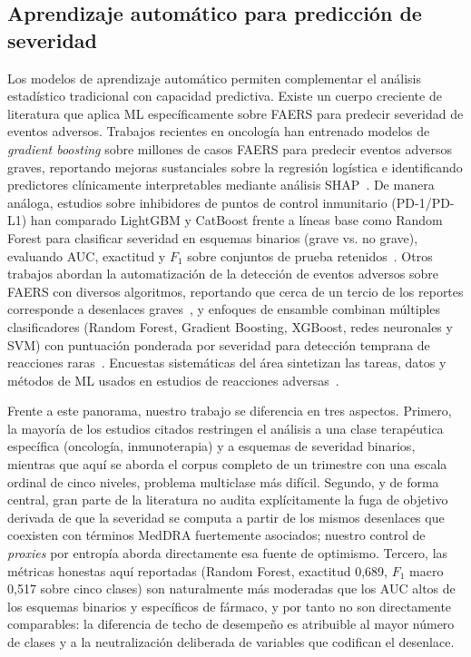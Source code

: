 \documentclass[12pt,a4paper]{article}
\begin{document}
\subsection{Aprendizaje automático para predicción de severidad}
Los modelos de aprendizaje automático permiten complementar el análisis estadístico tradicional con capacidad predictiva. Existe un cuerpo creciente de literatura que aplica ML específicamente sobre FAERS para predecir severidad de eventos adversos. Trabajos recientes en oncología han entrenado modelos de \textit{gradient boosting} sobre millones de casos FAERS para predecir eventos adversos graves, reportando mejoras sustanciales sobre la regresión logística e identificando predictores clínicamente interpretables mediante análisis SHAP~\cite{oncoSAE2026}. De manera análoga, estudios sobre inhibidores de puntos de control inmunitario (PD-1/PD-L1) han comparado LightGBM y CatBoost frente a líneas base como Random Forest para clasificar severidad en esquemas binarios (grave vs. no grave), evaluando AUC, exactitud y \(F_1\) sobre conjuntos de prueba retenidos~\cite{pd1faers2025}. Otros trabajos abordan la automatización de la detección de eventos adversos sobre FAERS con diversos algoritmos, reportando que cerca de un tercio de los reportes corresponde a desenlaces graves~\cite{automatingADE2024}, y enfoques de ensamble combinan múltiples clasificadores (Random Forest, Gradient Boosting, XGBoost, redes neuronales y SVM) con puntuación ponderada por severidad para detección temprana de reacciones raras~\cite{ensembleRare2026}. Encuestas sistemáticas del área sintetizan las tareas, datos y métodos de ML usados en estudios de reacciones adversas~\cite{nguyenSurvey2021}.

Frente a este panorama, nuestro trabajo se diferencia en tres aspectos. Primero, la mayoría de los estudios citados restringen el análisis a una clase terapéutica específica (oncología, inmunoterapia) y a esquemas de severidad binarios, mientras que aquí se aborda el corpus completo de un trimestre con una escala ordinal de cinco niveles, problema multiclase más difícil. Segundo, y de forma central, gran parte de la literatura no audita explícitamente la fuga de objetivo derivada de que la severidad se computa a partir de los mismos desenlaces que coexisten con términos MedDRA fuertemente asociados; nuestro control de \textit{proxies} por entropía aborda directamente esa fuente de optimismo. Tercero, las métricas honestas aquí reportadas (Random Forest, exactitud 0,689, \(F_1\) macro 0,517 sobre cinco clases) son naturalmente más moderadas que los AUC altos de los esquemas binarios y específicos de fármaco, y por tanto no son directamente comparables: la diferencia de techo de desempeño es atribuible al mayor número de clases y a la neutralización deliberada de variables que codifican el desenlace.
\end{document}

